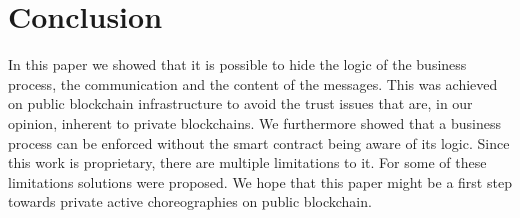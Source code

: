\documentclass[runningheads]{llncs}
\newcommand{\comment}[1]{}
\newcommand{\refsec}[1]{Section~\ref{#1}}
\begin{document}
\comment{
We would also like to mention parity ethereum. With parity, users are able to hide private contracts in public contracts  and to exchange private messages. However for private contract execution parity is relying on validators, "account[s] that can allow a private contract's state change" \cite{parity}. In our understanding this makes parity unfit for for untrusted business process execution, since, like private blockchains, it requires trust in one or multiple nodes.

\todo{parity comparison}
}
\section{Conclusion} \label{sec:conclusion}

\comment{
\begin{itemize}
    \item How could mentioned in \refsec{subsec:technologies} improve \refsec{sec:eval}?
    \item How did it work out in the end? 
\end{itemize}}

In this paper we showed that it is possible to hide the logic of the business process, the communication and the content of the messages. This was achieved on public blockchain infrastructure to avoid the trust issues that are, in our opinion, inherent to private blockchains. We furthermore showed that a business process can be enforced without the smart contract being aware of its logic. Since this work is proprietary, there are multiple limitations to it. For some of these limitations solutions were proposed. We hope that this paper might be a first step towards private active choreographies on public blockchain.





\end{document}
